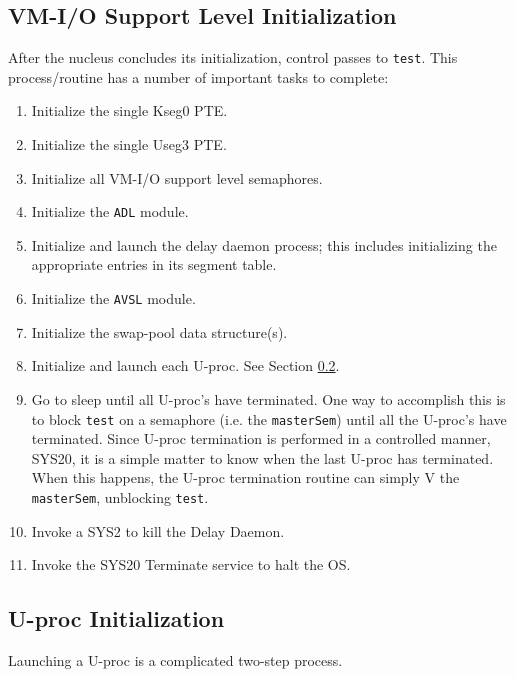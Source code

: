 \subsection{VM-I/O Support Level Initialization}
After the nucleus concludes its initialization, control passes to \verb+test+. 
This process/routine has a number of important tasks to complete:
\begin{enumerate}
\item Initialize the single Kseg0 PTE.
\item Initialize the single Useg3 PTE.
\item Initialize all VM-I/O support level semaphores.
\item Initialize the \verb+ADL+ module.
\item Initialize and launch the delay daemon process; this includes initializing the appropriate entries in its segment table.
\item Initialize the \verb+AVSL+ module.
\item Initialize the swap-pool data structure(s).
\item Initialize and launch each U-proc. See Section \ref{sec:uinit}.
\item Go to sleep until all U-proc's have terminated. 
One way to accomplish this is to block \verb+test+ on a semaphore (i.e. the \verb+masterSem+) until all the U-proc's have terminated. 
Since U-proc termination is performed in a controlled manner, SYS20, it is a simple matter to know when the last U-proc has terminated. 
When this happens, the U-proc termination routine can simply V the \verb+masterSem+, unblocking \verb+test+.
\item Invoke a SYS2 to kill the Delay Daemon.
\item Invoke the SYS20 Terminate service to halt the OS.
\end{enumerate}



\subsection{U-proc Initialization}\label{sec:uinit}
Launching a U-proc is a complicated two-step process.


